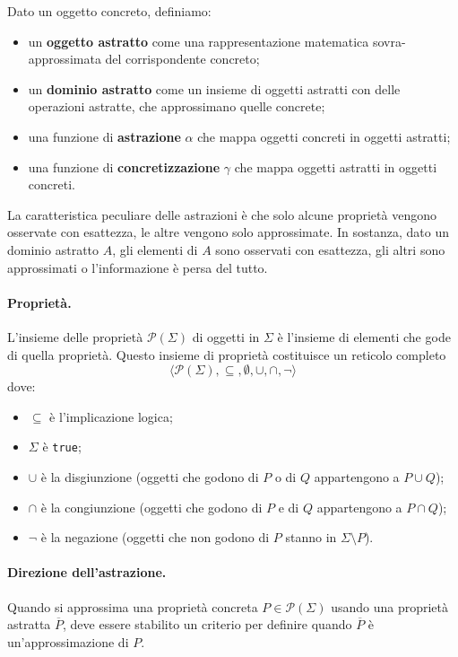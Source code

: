 \documentclass[a4paper, 11pt]{article}
\newcommand{\parts}[1]{\mathcal{P}(#1)}
\begin{document}
	Dato un oggetto concreto, definiamo:
	\begin{itemize}
		\item un \textbf{oggetto astratto} come una rappresentazione matematica sovra-approssimata del corrispondente concreto;
		\item un \textbf{dominio astratto} come un insieme di oggetti astratti con delle operazioni astratte, che approssimano quelle concrete;
		\item una funzione di \textbf{astrazione} $\alpha$ che mappa oggetti concreti in oggetti astratti;
		\item una funzione di \textbf{concretizzazione} $\gamma$ che mappa oggetti astratti in oggetti concreti.
	\end{itemize}
	
	La caratteristica peculiare delle astrazioni è che solo alcune proprietà vengono osservate con esattezza, le altre vengono solo approssimate. In sostanza, dato un dominio astratto $A$, gli elementi di $A$ sono osservati con esattezza, gli altri sono approssimati o l'informazione è persa del tutto.
	
	\paragraph{Proprietà.} L'insieme delle proprietà $\parts{\Sigma}$ di oggetti in $\Sigma$ è l'insieme di elementi che gode di quella proprietà. Questo insieme di proprietà costituisce un reticolo completo \[ \langle \parts{\Sigma}, \subseteq, \emptyset, \cup, \cap, \neg \rangle \] dove:
	\begin{itemize}
		\item $\subseteq$ è l'implicazione logica;
		\item $\Sigma$ è \verb|true|;
		\item $\cup$ è la disgiunzione (oggetti che godono di $P$ o di $Q$ appartengono a $P \cup Q$);
		\item $\cap$ è la congiunzione (oggetti che godono di $P$ e di $Q$ appartengono a $P \cap Q$);
		\item $\neg$ è la negazione (oggetti che non godono di $P$ stanno in $\Sigma \setminus P$).
	\end{itemize}

	\paragraph{Direzione dell'astrazione.}
	Quando si approssima una proprietà concreta $P \in \parts{\Sigma}$ usando una proprietà astratta $\overline{P}$, deve essere stabilito un criterio per definire quando $\overline{P}$ è un'approssimazione di $P$.
	
\end{document}
